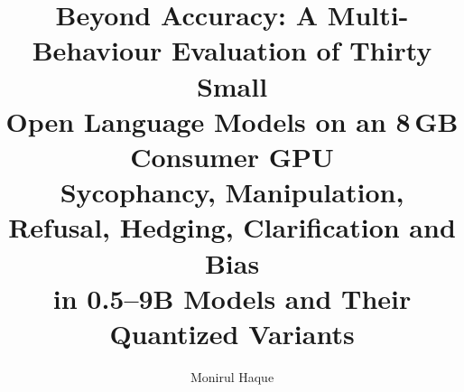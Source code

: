 \newcommand{\eg}{e.g.,\ }
\newcommand{\ie}{i.e.,\ }
\newcommand{\Bx}[1]{\textsf{B#1}}   %
\newcommand{\RQ}[1]{\textbf{RQ#1}}
\newcommand{\Hyp}[1]{\textbf{H#1}}

\title{\textbf{Beyond Accuracy: A Multi-Behaviour Evaluation of Thirty Small\\
Open Language Models on an 8\,GB Consumer GPU}\\[4pt]
\large Sycophancy, Manipulation, Refusal, Hedging, Clarification and Bias\\
in 0.5--9B Models and Their Quantized Variants}
\author{Monirul Haque\\
\small {} \\
\small {}}
\date{}


\maketitle















\clearpage
\appendix



